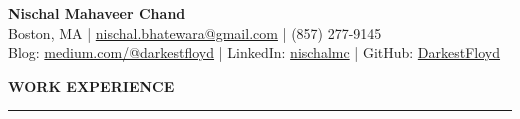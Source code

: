 \documentclass[a4paper]{article}
\newcommand{\myline}{\par
  \kern2pt %
  \hrule height 0.5pt
  \kern2pt %
}
\begin{document}
	\begin{center}
		{\LARGE \textbf{Nischal Mahaveer Chand}} \\
    Boston, MA | 
    \href{mailto:nischal.bhatewara@gmail.com}{nischal.bhatewara@gmail.com} | 
    (857) 277-9145 \\
		Blog: \href{https://medium.com/@darkestfloyd}{medium.com/@darkestfloyd} |
    LinkedIn: \href{https://www.linkedin.com/in/nischalmc}{nischalmc} |
                GitHub: \href{https://github.com/darkestfloyd}{DarkestFloyd} \\
	\end{center}
	


	\smallskip
	\smallskip
	\noindent
	{\large \textbf{WORK EXPERIENCE}}
	\myline 
	\smallskip
	
\end{document}

